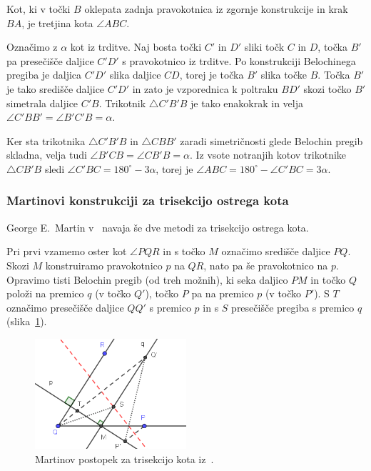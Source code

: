 \begin{trditev}
    Kot, ki v točki $B$ oklepata zadnja pravokotnica iz zgornje konstrukcije in krak $BA$, je tretjina kota $\angle ABC$.
\end{trditev}
\begin{dokaz}
    Označimo z $\alpha$ kot iz trditve. Naj bosta točki $C'$ in $D'$ sliki točk $C$ in $D$, točka $B'$ pa presečišče daljice $C'D'$ s pravokotnico iz trditve. Po konstrukciji Belochinega pregiba je daljica $C'D'$ slika daljice $CD$, torej je točka $B'$ slika točke $B$. Točka $B'$ je tako središče daljice $C'D'$ in zato je vzporednica k poltraku $BD'$ skozi točko $B'$ simetrala daljice $C'B$. Trikotnik $\triangle C'B'B$ je tako enakokrak in velja $\angle C'BB' = \angle B'C'B = \alpha$.
    
    Ker sta trikotnika $\triangle C'B'B$ in $\triangle CBB'$ zaradi simetričnosti glede Belochin pregib skladna, velja tudi $\angle B'CB = \angle CB'B = \alpha$. Iz vsote notranjih kotov trikotnike $\triangle CB'B$ sledi $\angle C'BC = 180^\circ - 3\alpha$, torej je $\angle ABC = 180^\circ - \angle C'BC = 3\alpha$. 
\end{dokaz}

\subsubsection*{Martinovi konstrukciji za trisekcijo ostrega kota}

George E.\ Martin v~\cite[poglavje 10]{geometricconstructions} navaja še dve metodi za trisekcijo ostrega kota.

Pri prvi vzamemo oster kot $\angle PQR$ in s točko $M$ označimo središče daljice $PQ$. Skozi $M$ konstruiramo pravokotnico $p$ na $QR$, nato pa še pravokotnico na $p$. Opravimo tisti Belochin pregib (od treh možnih), ki seka daljico $PM$ in točko $Q$ položi na premico $q$ (v točko $Q'$), točko $P$ pa na premico $p$ (v točko $P'$). S $T$ označimo presečišče daljice $QQ'$ s premico $p$ in s $S$ presečišče pregiba s premico $q$ (slika~\ref{fig:trisection_10.4}).

\begin{figure}[h]
    \centering
    \includegraphics[width=0.5\textwidth]{images/starogr_problemi/trisection_10.4.png}
    \caption[Martinova trisekcija ostrega kota (metoda $1$)]{Martinov postopek za trisekcijo kota iz~\cite[str.\ 154]{geometricconstructions}.}
    \label{fig:trisection_10.4}
\end{figure}

